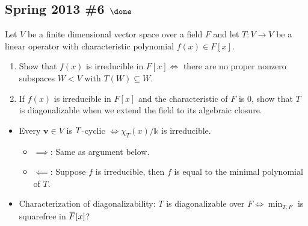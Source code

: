 \hypertarget{spring-2013-6-done}{%
\subsection{\texorpdfstring{Spring 2013 \#6
\(\done\)}{Spring 2013 \#6 \textbackslash done}}\label{spring-2013-6-done}}

Let \(V\) be a finite dimensional vector space over a field \(F\) and
let \(T: V\to V\) be a linear operator with characteristic polynomial
\(f(x) \in F[x]\).

\begin{enumerate}
\def\labelenumi{\alph{enumi}.}
\item
  Show that \(f(x)\) is irreducible in \(F[x] \iff\) there are no proper
  nonzero subspaces \(W< V\) with \(T(W) \subseteq W\).
\item
  If \(f(x)\) is irreducible in \(F[x]\) and the characteristic of \(F\)
  is 0, show that \(T\) is diagonalizable when we extend the field to
  its algebraic closure.
\end{enumerate}


\begin{concept}

\envlist

\begin{itemize}
\tightlist
\item
  Every \(\mathbf{v}\in V\) is \(T{\hbox{-}}\)cyclic
  \(\iff \chi_T(x)/{\mathbb{k}}\) is irreducible.

  \begin{itemize}
  \tightlist
  \item
    \(\implies\): Same as argument below.
  \item
    \(\impliedby\): Suppose \(f\) is irreducible, then \(f\) is equal to
    the minimal polynomial of \(T\).
  \end{itemize}
\item
  Characterization of diagonalizability: \(T\) is diagonalizable over
  \(F \iff \min_{T, F}\) is squarefree in
  \(\mkern 1.5mu\overline{\mkern-1.5muF\mkern-1.5mu}\mkern 1.5mu[x]\)?
\end{itemize}

\end{concept}


